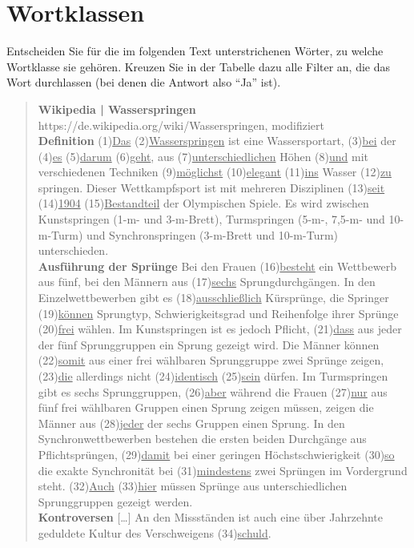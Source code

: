 
\section{Wortklassen}\label{sec:bestimmen}

Entscheiden Sie für die im folgenden Text unterstrichenen Wörter, zu welche Wortklasse sie gehören.
Kreuzen Sie in der Tabelle dazu alle Filter an, die das Wort durchlassen (bei denen die Antwort also "`Ja"' ist). 

\begin{nohyphens}\begin{quote}
  \textbf{Wikipedia | Wasserspringen}\\
  https://de.wikipedia.org/wiki/Wasserspringen, modifiziert\\[0.5\baselineskip]
  \textbf{Definition}
  (1)\ul{Das} (2)\ul{Wasserspringen} ist eine Wassersportart, (3)\ul{bei} der (4)\ul{es} (5)\ul{darum} (6)\ul{geht}, aus (7)\ul{unterschiedlichen} Höhen (8)\ul{und} mit verschiedenen Techniken (9)\ul{möglichst} (10)\ul{elegant} (11)\ul{ins} Wasser (12)\ul{zu} springen.
  Dieser Wettkampfsport ist mit mehreren Disziplinen (13)\ul{seit} (14)\ul{1904} (15)\ul{Bestandteil} der Olympischen Spiele.
  Es wird zwischen Kunstspringen (1-m- und 3-m-Brett), Turmspringen (5-m-, 7,5-m- und 10-m-Turm) und Synchronspringen (3-m-Brett und 10-m-Turm) unterschieden.\\[0.5\baselineskip]
  \textbf{Ausführung der Sprünge}
  Bei den Frauen (16)\ul{besteht} ein Wettbewerb aus fünf, bei den Männern aus (17)\ul{sechs} Sprungdurchgängen.
  In den Einzelwettbewerben gibt es (18)\ul{ausschließlich} Kürsprünge, die Springer (19)\ul{können} Sprungtyp, Schwierigkeitsgrad und Reihenfolge ihrer Sprünge (20)\ul{frei} wählen.
  Im Kunstspringen ist es jedoch Pflicht, (21)\ul{dass} aus jeder der fünf Sprunggruppen ein Sprung gezeigt wird.
  Die Männer können (22)\ul{somit} aus einer frei wählbaren Sprunggruppe zwei Sprünge zeigen, (23)\ul{die} allerdings nicht (24)\ul{identisch} (25)\ul{sein} dürfen.
  Im Turmspringen gibt es sechs Sprunggruppen, (26)\ul{aber} während die Frauen (27)\ul{nur} aus fünf frei wählbaren Gruppen einen Sprung zeigen müssen, zeigen die Männer aus (28)\ul{jeder} der sechs Gruppen einen Sprung.
  In den Synchronwettbewerben bestehen die ersten beiden Durchgänge aus Pflichtsprüngen, (29)\ul{damit} bei einer geringen Höchstschwierigkeit (30)\ul{so} die exakte Synchronität bei (31)\ul{mindestens} zwei Sprüngen im Vordergrund steht.
  (32)\ul{Auch} (33)\ul{hier} müssen Sprünge aus unterschiedlichen Sprunggruppen gezeigt werden.\\[0.5\baselineskip]
  \textbf{Kontroversen} [\ldots] An den Missständen ist auch eine über Jahrzehnte geduldete Kultur des Verschweigens (34)\ul{schuld}.
\end{quote}\end{nohyphens}

